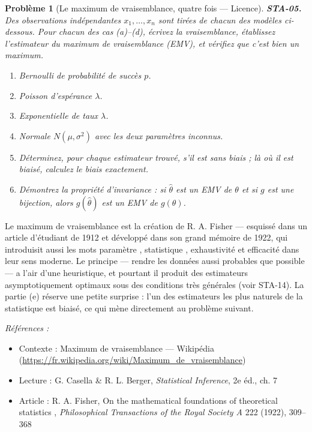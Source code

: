 \documentclass[11pt]{article}
\newtheorem{problem}{Problème}
\newenvironment{refs}{\par\small\noindent\emph{Références :}\begin{itemize}\setlength\itemsep{0pt}}{\end{itemize}\normalsize}
\begin{document}
\bigskip

\begin{problem}[{Le maximum de vraisemblance, quatre fois --- Licence}]
\textbf{STA-05.} Des observations indépendantes $ x_1, \dots, x_n $ sont tirées de chacun des
modèles ci-dessous. Pour chacun des cas (a)--(d), écrivez la vraisemblance, établissez l'estimateur
du maximum de vraisemblance (EMV), et vérifiez que c'est bien un maximum.
\begin{enumerate}
\item[(a)] Bernoulli de probabilité de succès $ p $.
\item[(b)] Poisson d'espérance $ \lambda $.
\item[(c)] Exponentielle de taux $ \lambda $.
\item[(d)] Normale $ N(\mu, \sigma^2) $ avec les deux paramètres inconnus.
\item[(e)] Déterminez, pour chaque estimateur trouvé, s'il est sans biais ; là où il est biaisé, calculez
le biais exactement.
\item[(f)] Démontrez la propriété d'invariance : si $ \hat{\theta} $ est un EMV de $ \theta $ et si
$ g $ est une bijection, alors $ g(\hat{\theta}) $ est un EMV de $ g(\theta) $.
\end{enumerate}

\end{problem}

\noindent Le maximum de vraisemblance est la création de R. A. Fisher --- esquissé dans un
article d'étudiant de 1912 et développé dans son grand mémoire de 1922, qui introduisit aussi les
mots \og{} paramètre \fg{}, \og{} statistique \fg{}, \og{} exhaustivité \fg{} et \og{} efficacité \fg{} dans leur sens moderne. Le
principe --- rendre les données aussi probables que possible --- a l'air d'une heuristique, et pourtant
il produit des estimateurs asymptotiquement optimaux sous des conditions très générales (voir
STA-14). La partie (e) réserve une petite surprise : l'un des estimateurs les plus naturels de la
statistique est biaisé, ce qui mène directement au problème suivant.

\begin{refs}
\item Contexte : Maximum de vraisemblance --- Wikipédia (\url{https://fr.wikipedia.org/wiki/Maximum_de_vraisemblance})
\item Lecture : G. Casella \& R. L. Berger, \textit{Statistical Inference}, 2e éd., ch. 7
\item Article : R. A. Fisher, \og{} On the mathematical foundations of theoretical statistics \fg{}, \textit{Philosophical Transactions of the Royal Society A} 222 (1922), 309--368
\end{refs}
\end{document}
